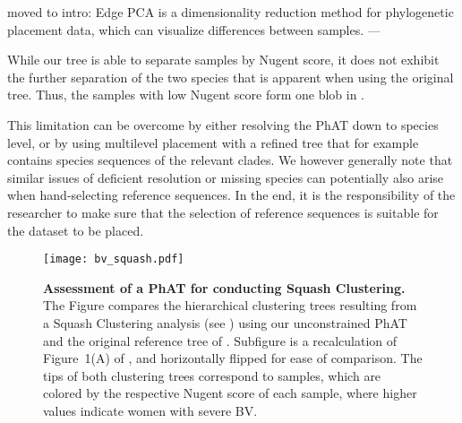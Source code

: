     moved to intro:
    Edge PCA \citep{Matsen2011a} is a dimensionality reduction method for phylogenetic placement data,
    which can visualize differences between samples.
       ---

While our tree is able to separate samples by Nugent score,
it does not exhibit the further separation of the two  species
that is apparent when using the original tree.
Thus, the samples with low Nugent score form one blob in .

This limitation can be overcome by either resolving the \ac{PhAT} down to species level,
or by using multilevel placement with a refined tree
that for example contains species sequences of the relevant  clades.
We however generally note that similar issues of deficient resolution or missing species
can potentially also arise when hand-selecting reference sequences.
In the end, it is the responsibility of the researcher to make sure that the selection of reference sequences
is suitable for the dataset to be placed.

\begin{figure}[hpbt]
    \centering
    \texttt{[image: bv\_squash.pdf]}
    \begin{subfigure}{0pt}
        \label{fig:bv_squash:sub:squash_art}
    \end{subfigure}
    \begin{subfigure}{0pt}
        \label{fig:bv_squash:sub:squash_orig}
    \end{subfigure}
    \caption[Assessment of a \acs{PhAT} for conducting Squash Clustering]{
        \textbf{Assessment of a \acs{PhAT} for conducting Squash Clustering.}
        The Figure compares the hierarchical clustering trees resulting from a Squash Clustering analysis
        (see )
        using   our unconstrained  \acs{PhAT} and
         the original reference tree of \citep{Srinivasan2012}.
        Subfigure  is a recalculation of Figure~1(A) of \citep{Srinivasan2012},
        and horizontally flipped for ease of comparison.
        The tips of both clustering trees correspond to samples,
        which are colored by the respective Nugent score of each sample,
        where higher values indicate women with severe \acl{BV}.
    }
    \label{fig:bv_squash}
\end{figure}

